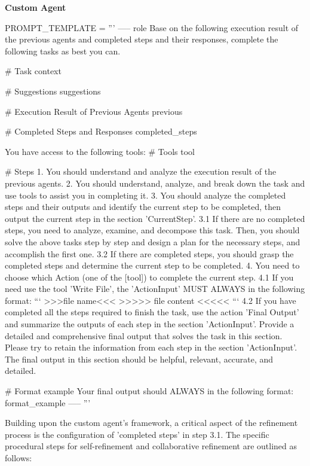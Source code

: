 \noindent
\begin{frame}[Prompt]{\textbf{Custom Agent}}
\begin{code}
PROMPT_TEMPLATE = '''
-----
{role} Base on the following execution result of the previous agents and completed 
steps and their responses, complete the following tasks as best you can. 

# Task {context}

# Suggestions
{suggestions}

# Execution Result of Previous Agents {previous}

# Completed Steps and Responses {completed_steps} 

You have access to the following tools:
# Tools {tool}

# Steps
1. You should understand and analyze the execution result of the previous agents.
2. You should understand, analyze, and break down the task and use tools to assist 
you in completing it.
3. You should analyze the completed steps and their outputs and identify the 
current step to be completed, then output the current step in the section 
'CurrentStep'.
3.1 If there are no completed steps, you need to analyze, examine, and decompose 
this task. Then, you should solve the above tasks step by step and design a plan 
for the necessary steps, and accomplish the first one.
3.2 If there are completed steps, you should grasp the completed steps and 
determine the current step to be completed. 
4. You need to choose which Action (one of the [{tool}]) to complete the current 
step. 
4.1 If you need use the tool 'Write File', the 'ActionInput' MUST ALWAYS in the 
following format:
```
>>>file name<<<
>>>>>
file content
<<<<<
```
4.2 If you have completed all the steps required to finish the task, use the action 
'Final Output' and summarize the outputs of each step in the section 'ActionInput'. 
Provide a detailed and comprehensive final output that solves the task in this 
section. Please try to retain the information from each step in the section 
'ActionInput'. The final output in this section should be helpful, relevant, 
accurate, and detailed.


# Format example
Your final output should ALWAYS in the following format:
{format_example}
-----
'''
\end{code}
\end{frame}


Building upon the custom agent's framework, a critical aspect of the refinement process is the configuration of 'completed steps' in step 3.1. The specific procedural steps for self-refinement and collaborative refinement are outlined as follows:

